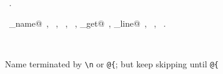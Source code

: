 \documentclass{report}
\begin{document}
\begin{flushleft}
\begin{minipage}{\linewidth}
\begin{list}{}{\setlength{\itemsep}{-\parsep}\setlength{\itemindent}{-\leftmargin}}
\item \NWtxtMacroRefIn\ .
\end{list}
\vspace{-2ex}
\footnotesize\addtolength{\baselineskip}{-1ex}
\begin{list}{}{\setlength{\itemsep}{-\parsep}\setlength{\itemindent}{-\leftmargin}}
\item \NWtxtIdentsUsed\nobreak\  \verb@command_name@\nobreak\ , \verb@FALSE@\nobreak\ , \verb@fprintf@\nobreak\ , \verb@isspace@\nobreak\ , \verb@source_get@\nobreak\ , \verb@source_line@\nobreak\ , \verb@stderr@\nobreak\ , \verb@TRUE@\nobreak\ .\end{list}
\end{minipage}\\[4ex]
\end{flushleft}
Name terminated by \verb+\n+ or \verb+@{+; but keep skipping until \verb+@{+
\end{document}
